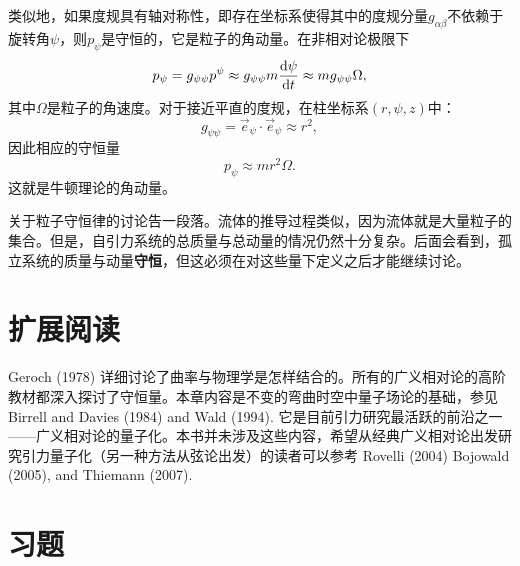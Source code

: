 类似地，如果度规具有轴对称性，即存在坐标系使得其中的度规分量$g_{\alpha \beta}$不依赖于旋转角$\psi$，则$p_\psi$是守恒的，它是粒子的角动量。在非相对论极限下
\begin{equation}
    p_\psi = g_{\psi \psi} p^\psi \approx g_{\psi \psi} m \frac{\mathrm{d} \psi}{\mathrm{d} t} \approx mg_{\psi \psi} \Omega,
\label{equ7.35}
\end{equation}
其中$\Omega$是粒子的角速度。对于接近平直的度规，在柱坐标系$(r, \psi, z)$中：
\begin{equation}
    g_{\psi \psi} = \vec{e}_\psi \cdot \vec{e}_\psi \approx r^2,
\label{equ7.36}
\end{equation}
因此相应的守恒量
\begin{equation}
    p_\psi \approx mr^2 \Omega.
\label{equ7.37}
\end{equation}
这就是牛顿理论的角动量。

关于粒子守恒律的讨论告一段落。流体的推导过程类似，因为流体就是大量粒子的集合。但是，自引力系统的总质量与总动量的情况仍然十分复杂。后面会看到，孤立系统的质量与动量\textbf{守恒}，但这必须在对这些量下定义之后才能继续讨论。


\section{扩展阅读}
\label{sec7.5}
Geroch (1978) 详细讨论了曲率与物理学是怎样结合的。所有的广义相对论的高阶教材都深入探讨了守恒量。本章内容是不变的弯曲时空中量子场论的基础，参见Birrell and Davies (1984) and Wald (1994). 它是目前引力研究最活跃的前沿之一——广义相对论的量子化。本书并未涉及这些内容，希望从经典广义相对论出发研究引力量子化（另一种方法从弦论出发）的读者可以参考 Rovelli (2004) Bojowald (2005), and Thiemann (2007).


\section{习题}
\label{sec7.6}